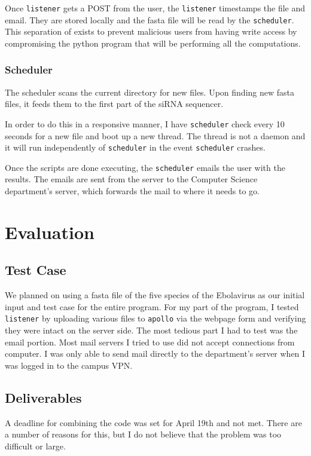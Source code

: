 \documentclass[10pt,letterpaper]{article}
\begin{document}
Once \texttt{listener} gets a POST from the user, the \texttt{listener} timestamps the file  and email.
They are stored locally and the fasta file will be read by the \texttt{scheduler}.
This separation of exists to prevent malicious users from having write access by compromising the python program that will be performing all the computations.


\subsubsection{Scheduler}
The scheduler scans the current directory for new files.
Upon finding new fasta files, it feeds them to the first part of the siRNA sequencer.

In order to do this in a responsive manner, I have \texttt{scheduler} check every 10 seconds for a new file and boot up a new thread.
The thread is not a daemon and it will run independently of \texttt{scheduler} in the event \texttt{scheduler} crashes.

Once the scripts are done executing, the \texttt{scheduler} emails the user with the results.
The emails are sent from the server to the Computer Science department's server, which forwards the mail to where it needs to go.



\section{Evaluation}

\subsection{Test Case}
We planned on using a fasta file of the five species of the Ebolavirus as our initial input and test case for the entire program.
For my part of the program, I tested \texttt{listener} by uploading various files to \texttt{apollo} via the webpage form and verifying they were intact on the server side.
The most tedious part I had to test was the email portion. 
Most mail servers I tried to use did not accept connections from computer.
I was only able to send mail directly to the department's server when I was logged in to the campus VPN.

\subsection{Deliverables}
A deadline for combining the code was set for April 19th and not met.
There are a number of reasons for this, but I do not believe that the problem was too difficult or large.
\end{document}
